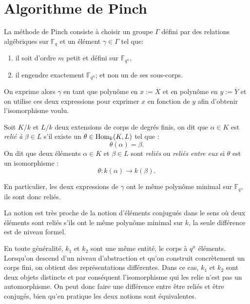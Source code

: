 \documentclass[a4paper]{article} %
\numberwithin{section}{part}
\numberwithin{equation}{section}
\newcommand\GF[1]{\mathbb{F}_{#1}}
\begin{document}
\section{Algorithme de Pinch}
\label{sec:algpinch}
La méthode de Pinch consiste à choisir un groupe $\Gamma$ défini par des 
relations algébriques sur $\GF{q}$ et un élément $\gamma\in\Gamma$ tel que:
\vspace{0.3cm}
\begin{enumerate}[1.]
\item il soit d'ordre $m$ petit et défini sur $\GF{q^n}$,
\item il engendre exactement $\GF{q^n}$; et non un de ses sous-corps.
\end{enumerate}
\vspace{0.3cm}
On exprime alors $\gamma$ en tant que polynôme en $x := \overline{X}$ et en 
polynôme en $y := \overline{Y}$ et on utilise ces deux expressions pour exprimer
$x$ en fonction de $y$ afin d'obtenir l'isomorphisme voulu.\par
\begin{defn}
    Soit $K/k$ et $L/k$ deux extensions de corps de degrés finis, on dit que 
    $\alpha\in K$ est \emph{relié à} $\beta\in L$ s'il existe un
    $\theta\in\textup{Hom}_k(K, L)$ tel que :
    \begin{equation}
        \theta(\alpha) = \beta.
    \end{equation}
    On dit que deux éléments $\alpha\in K$ et $\beta\in L$ sont \emph{reliés}
    ou \emph{reliés entre eux} si $\theta$ est un isomorphisme :
    \begin{equation}
        \theta : k(\alpha)\to k(\beta).
    \end{equation}
\end{defn}
En particulier, les deux expressions de $\gamma$ ont le même polynôme minimal
sur $\GF{q}$, ils sont donc reliés.
\begin{rem}
La notion est très proche de la notion d'éléments conjugués dans le sens où deux
éléments sont reliés s'ils ont le même polynôme minimal sur $k$, la 
seule différence est de niveau formel.\par
En toute généralité, $k_1$ et $k_2$ sont une même entité, le corps à $q^n$ 
éléments. Lorsqu'on descend d'un niveau d'abstraction et qu'on construit
concrètement un corps fini, on obtient des représentations différentes. Dans
ce cas, $k_1$ et $k_2$ sont deux objets distincts et par conséquent 
l'isomorphisme qui les relie n'est pas un automorphisme. On peut donc
faire une différence entre être reliés et être conjugés, bien qu'en pratique les
deux notions sont équivalentes.
\end{rem}
\end{document}
